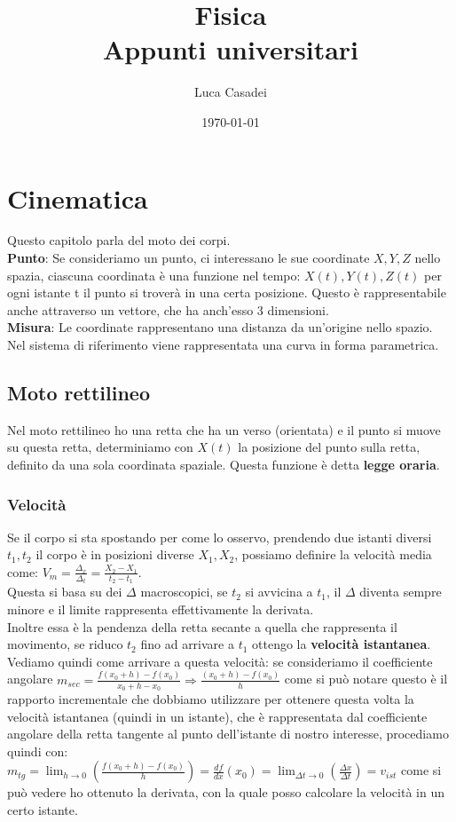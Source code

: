 \documentclass[a4paper,12pt]{report}
\title{\textbf{Fisica}\\Appunti universitari}
\author{Luca Casadei}
\date{\today}
\begin{document}
	\maketitle
	\tableofcontents
	\chapter{Cinematica}
	Questo capitolo parla del moto dei corpi.\\
	\textbf{Punto}: Se consideriamo un punto, ci interessano le sue coordinate ${X,Y,Z}$ nello spazia, ciascuna coordinata è una funzione nel tempo:
	${X(t),Y(t),Z(t)}$ per ogni istante t il punto si troverà in una certa posizione. Questo è rappresentabile anche attraverso un vettore, che ha anch'esso 3 dimensioni.\\
	\textbf{Misura}: Le coordinate rappresentano una distanza da un'origine nello spazio.
	Nel sistema di riferimento viene rappresentata una curva in forma parametrica.
	\section{Moto rettilineo}
	Nel moto rettilineo ho una retta che ha un verso (orientata) e il punto si muove su questa retta, determiniamo con ${X(t)}$ la posizione del punto sulla retta, definito da una sola coordinata spaziale. Questa funzione è detta \textbf{legge oraria}.
	\subsection{Velocità}
	Se il corpo si sta spostando per come lo osservo, prendendo due istanti diversi ${t_1,t_2}$ il corpo è in posizioni diverse ${X_1,X_2}$, possiamo definire la velocità media come: ${V_m = \frac{\Delta_x}{\Delta_t} = \frac{X_2 - X_1}{t_2 - t_1}}$.\\
	Questa si basa su dei ${\Delta}$ macroscopici, se ${t_2}$ si avvicina a ${t_1}$, il ${\Delta}$ diventa sempre minore e il limite rappresenta effettivamente la derivata.\\
	Inoltre essa è la pendenza della retta secante a quella che rappresenta il movimento, se riduco $t_2$ fino ad arrivare a $t_1$ ottengo la \textbf{velocità istantanea}.\\
	Vediamo quindi come arrivare a questa velocità: se consideriamo il coefficiente angolare $m_{sec} = {{\frac{f(x_0 + h) - f(x_0)}{x_0 + h - x_0}} \Rightarrow {\frac{(x_0 + h) - f(x_0)}{h}}}$ come si può notare questo è il rapporto incrementale che dobbiamo utilizzare per ottenere questa volta la velocità istantanea (quindi in un istante), che è rappresentata dal coefficiente angolare della retta tangente al punto dell'istante di nostro interesse, procediamo quindi con: $m_{tg} = {\lim_{h\to0}(\frac{f(x_0 + h) - f(x_0)}{h})} = {\frac{df}{dx}(x_0)} = {\lim_{\Delta t\to0}(\frac{\Delta x}{\Delta t})} = v_{ist}$ come si può vedere ho ottenuto la derivata, con la quale posso calcolare la velocità in un certo istante.
\end{document}
